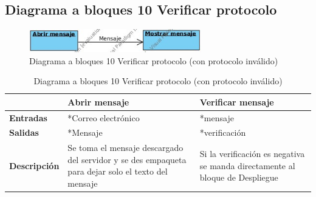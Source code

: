 \subsection{Diagrama a bloques 10 Verificar protocolo}
\begin{figure}[H]
	\includegraphics[width=1\linewidth, height=1cm]{./images/bloques10.jpg}
	\caption{Diagrama a bloques 10 Verificar protocolo (con protocolo inválido)}
	\label{fig:5-9-1}
\end{figure}
\begin{table}[H]
 \centering
   {
     \begin{tabular}{| p{3cm} | p{4cm} | p{4cm} |}
     \hline
     & \textbf{Abrir mensaje} & \textbf{Verificar mensaje}\\
     \hline
     \textbf{Entradas} & *Correo electrónico & *mensaje\\
     \hline
     \textbf{Salidas} & *Mensaje & *verificación\\
     \hline
     \textbf{Descripción} & Se toma el mensaje descargado del servidor y se des empaqueta para dejar solo el texto del mensaje & Si la verificación es negativa se manda directamente al bloque de Despliegue\\
	\hline
    \end{tabular}
    }
    \caption{Diagrama a bloques 10 Verificar protocolo (con protocolo inválido)	}
    \label{tabla:b10}
\end{table}

